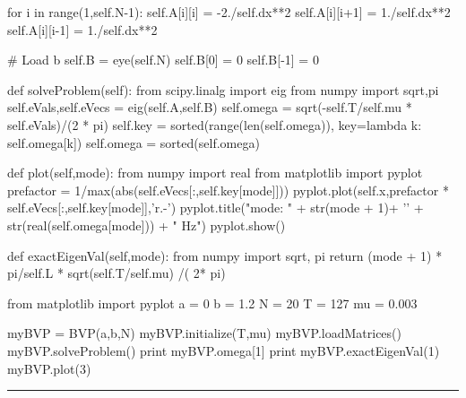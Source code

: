 \begin{enumerate}
\begin{enumerate}
\begin{codeexample}
\begin{VerbatimOut}{\listingFile}
        for i in range(1,self.N-1):
            self.A[i][i] = -2./self.dx**2
            self.A[i][i+1] = 1./self.dx**2
            self.A[i][i-1] = 1./self.dx**2

        # Load b
        self.B = eye(self.N)
        self.B[0] = 0
        self.B[-1] = 0

    def solveProblem(self):
        from scipy.linalg import eig
        from numpy import sqrt,pi
        self.eVals,self.eVecs = eig(self.A,self.B)
        self.omega = sqrt(-self.T/self.mu * self.eVals)/(2 * pi)
        self.key = sorted(range(len(self.omega)), key=lambda k: self.omega[k])
        self.omega = sorted(self.omega)

    def plot(self,mode):
        from numpy import real
        from matplotlib import pyplot
        prefactor = 1/max(abs(self.eVecs[:,self.key[mode]]))
        pyplot.plot(self.x,prefactor * self.eVecs[:,self.key[mode]],'r.-')
        pyplot.title("mode:  " + str(mode + 1)+ '\n' +  str(real(self.omega[mode])) + " Hz")
        pyplot.show()

    def exactEigenVal(self,mode):
        from numpy import sqrt, pi
        return (mode + 1) * pi/self.L * sqrt(self.T/self.mu) /( 2* pi)

from matplotlib import pyplot
a = 0
b = 1.2
N = 20
T  = 127
mu = 0.003

myBVP = BVP(a,b,N)
myBVP.initialize(T,mu)
myBVP.loadMatrices()
myBVP.solveProblem()
print myBVP.omega[1]
print myBVP.exactEigenVal(1)
myBVP.plot(3)
\end{VerbatimOut}
\end{codeexample}
\else
\noindent\rule{5 in}{0.01 in}
\fi

\end{enumerate}
\end{enumerate}


